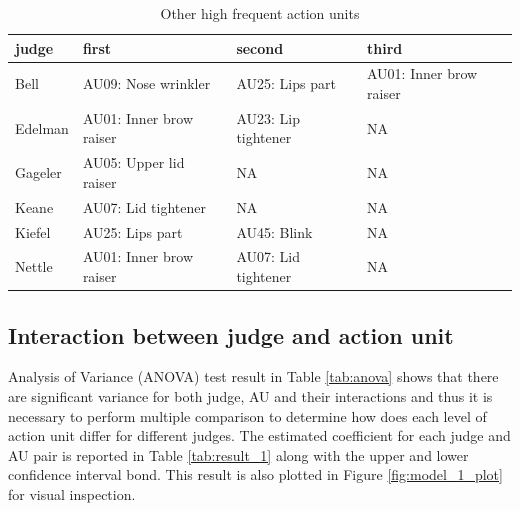 \documentclass{monashthesis}
\begin{document}
\begin{table}[t]

\caption{\label{tab:unnamed-chunk-7}\label{tab:other_highf} Other high frequent action units }
\centering
\begin{tabular}{l|l|l|l}
\hline
judge & first & second & third\\
\hline
Bell & AU09: Nose wrinkler & AU25: Lips part & AU01: Inner brow raiser\\
\hline
Edelman & AU01: Inner brow raiser & AU23: Lip tightener & NA\\
\hline
Gageler & AU05: Upper lid raiser & NA & NA\\
\hline
Keane & AU07: Lid tightener & NA & NA\\
\hline
Kiefel & AU25: Lips part & AU45: Blink & NA\\
\hline
Nettle & AU01: Inner brow raiser & AU07: Lid tightener & NA\\
\hline
\end{tabular}
\end{table}

\hypertarget{interaction-between-judge-and-action-unit}{%
\subsection{Interaction between judge and action unit}\label{interaction-between-judge-and-action-unit}}

Analysis of Variance (ANOVA) test result in Table \ref{tab:anova} shows that there are significant variance for both judge, AU and their interactions and thus it is necessary to perform multiple comparison to determine how does each level of action unit differ for different judges. The estimated coefficient for each judge and AU pair is reported in Table \ref{tab:result_1} along with the upper and lower confidence interval bond. This result is also plotted in Figure \ref{fig:model_1_plot} for visual inspection.
\end{document}

